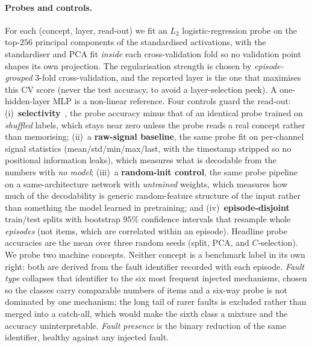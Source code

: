 \paragraph{Probes and controls.} For each (concept, layer, read-out) we fit an $L_2$ logistic-regression probe on the top-$256$ principal components of the standardised activations, with the standardiser and PCA fit \emph{inside} each cross-validation fold so no validation point shapes its own projection. The regularisation strength is chosen by \emph{episode-grouped} 3-fold cross-validation, and the reported layer is the one that maximises this CV score (never the test accuracy, to avoid a layer-selection peek). A one-hidden-layer MLP is a non-linear reference. Four controls guard the read-out: (i)~\textbf{selectivity}~\cite{hewitt2019control}, the probe accuracy minus that of an identical probe trained on \emph{shuffled} labels, which stays near zero unless the probe reads a real concept rather than memorising; (ii)~a \textbf{raw-signal baseline}, the same probe fit on per-channel signal statistics (mean/std/min/max/last, with the timestamp stripped so no positional information leaks), which measures what is decodable from the numbers with \emph{no model}; (iii)~a \textbf{random-init control}, the same probe pipeline on a same-architecture network with \emph{untrained} weights, which measures how much of the decodability is generic random-feature structure of the input rather than something the model learned in pretraining; and (iv)~\textbf{episode-disjoint} train/test splits with bootstrap $95\%$ confidence intervals that resample whole \emph{episodes} (not items, which are correlated within an episode). Headline probe accuracies are the mean over three random seeds (split, PCA, and $C$-selection). We probe two machine concepts. Neither concept is a benchmark label in its own right: both are derived from the fault identifier recorded with each episode. \emph{Fault type} collapses that identifier to the six most frequent injected mechanisms, chosen so the classes carry comparable numbers of items and a six-way probe is not dominated by one mechanism; the long tail of rarer faults is excluded rather than merged into a catch-all, which would make the sixth class a mixture and the accuracy uninterpretable. \emph{Fault presence} is the binary reduction of the same identifier, healthy against any injected fault.

